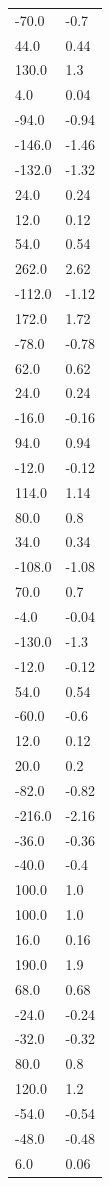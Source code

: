 \begin{longtable}{ll}
-70.0 & -0.7 \\
44.0 & 0.44 \\
130.0 & 1.3 \\
4.0 & 0.04 \\
-94.0 & -0.94 \\
-146.0 & -1.46 \\
-132.0 & -1.32 \\
24.0 & 0.24 \\
12.0 & 0.12 \\
54.0 & 0.54 \\
262.0 & 2.62 \\
-112.0 & -1.12 \\
172.0 & 1.72 \\
-78.0 & -0.78 \\
62.0 & 0.62 \\
24.0 & 0.24 \\
-16.0 & -0.16 \\
94.0 & 0.94 \\
-12.0 & -0.12 \\
114.0 & 1.14 \\
80.0 & 0.8 \\
34.0 & 0.34 \\
-108.0 & -1.08 \\
70.0 & 0.7 \\
-4.0 & -0.04 \\
-130.0 & -1.3 \\
-12.0 & -0.12 \\
54.0 & 0.54 \\
-60.0 & -0.6 \\
12.0 & 0.12 \\
20.0 & 0.2 \\
-82.0 & -0.82 \\
-216.0 & -2.16 \\
-36.0 & -0.36 \\
-40.0 & -0.4 \\
100.0 & 1.0 \\
100.0 & 1.0 \\
16.0 & 0.16 \\
190.0 & 1.9 \\
68.0 & 0.68 \\
-24.0 & -0.24 \\
-32.0 & -0.32 \\
80.0 & 0.8 \\
120.0 & 1.2 \\
-54.0 & -0.54 \\
-48.0 & -0.48 \\
6.0 & 0.06 \\

\end{longtable}
